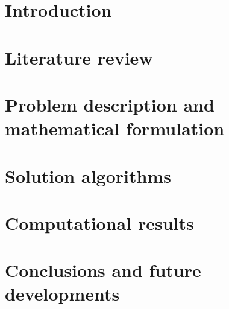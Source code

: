 \documentclass{Configuration_Files/PoliMi3i_thesis}
\theoremstyle{colored}
\theoremstyle{colored}
\begin{document}
    \chapter{Introduction}
    \label{chapter:introduction}%
    

    \chapter{Literature review}
    \label{chapter:literature}%
    

    \chapter{Problem description and mathematical formulation}
    \label{chapter:problem}%
    

    \chapter{Solution algorithms}
    \label{chapter:heuristics}%
    

    \chapter{Computational results}
    \label{chapther:experiments}%
    

    \chapter{Conclusions and future developments}
    \label{chapther:conclusions}%
    




    \cleardoublepage
    \appendix
\end{document}
